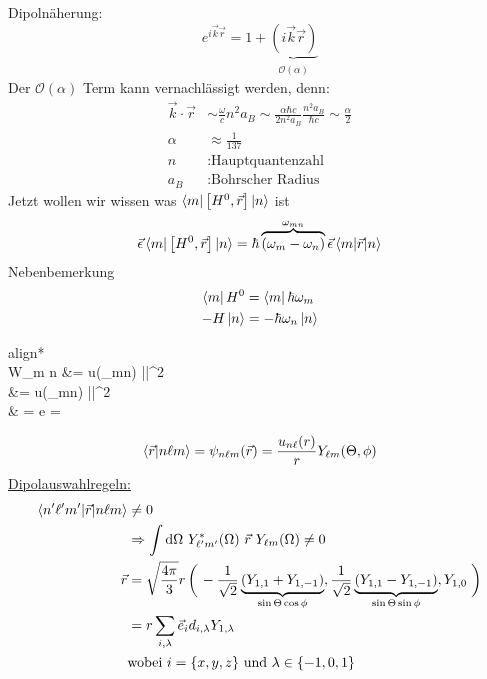 	Dipolnäherung: 
		\begin{equation*}
			e^{i \vec{k} \vec{r}} = 1 + 
			\underbrace{(i \vec{k} \vec{r})}_{\substack{\mathcal{O}(\alpha)}}
		\end{equation*}
	Der $\mathcal{O}(\alpha)$ Term kann vernachlässigt werden, denn:
		\begin{align*}
			\vec{k} \cdot \vec{r} 
			&\sim \frac{\omega}{c} n^2 a_B
			\sim \frac{\alpha \hbar c}{2 n^2 a_B} \frac{n^2 a_B}{\hbar c}
			\sim \frac{\alpha}{2} \\
			\alpha &\approx \frac{1}{137} \\
			n &: \text{Hauptquantenzahl} \\	
			a_B &: \text{Bohrscher Radius}		
		\end{align*}
	Jetzt wollen wir wissen was $\braket{m | \left[H^0 , \vec{r}\right] | n}$ ist
		\begin{align*}
			\vec{\epsilon} \braket{m | \left[H^0 , \vec{r}\right] | n} 
			= \hbar \overbrace{(\omega_m - \omega_n)}^{\mathclap{\omega_{mn}}} \vec{\epsilon} \braket{m | \vec{r} | n}
		\end{align*}
	Nebenbemerkung 
		\begin{align*}
			\bra{m} H^0 &= \bra{m} \hbar \omega_m \\
			-H \ket{n} &= -\hbar \omega_n \ket{n}
		\end{align*}
		\begin{empheq}[box=\boxed]{align*}
			 \\
					W_{m \rightarrow n} &=  u(\omega_{mn}) 
					\left|\right|^2\\
					&=  u(\omega_{mn}) 
					\left|\right|^2\\
					&  = e  =  \cdot {}
		\end{empheq}
		\begin{equation*}
			\braket{\vec{r} | n \ell m} = \psi_{n \ell m} (\vec{r}) 
			= \frac{u_{n \ell}(r)}{r} Y_{\ell m} (\Theta, \phi)
		\end{equation*}
	\underline{Dipolauswahlregeln:}
		\begin{align*}
			\braket{n' \ell' m' | \vec{r} | n \ell m} &\neq 0 \\
			&\Rightarrow \int \diff \Omega~Y^*_{\ell' m'}(\Omega)~\vec{r}~Y_{\ell m} (\Omega) \neq 0 \\
			\vec{r} &= \sqrt{\frac{4 \pi}{3}} r 
			\left( \vphantom{-\frac{1}{\sqrt{2}}} \right. -\frac{1}{\sqrt{2}} 
				\underbrace{(Y_{1,1} + Y_{1,-1})}_{\mathclap{\sin \Theta \cos \phi}},
				\frac{1}{\sqrt{2}} \underbrace{(Y_{1,1} - Y_{1,-1})}_{\mathclap{\sin \Theta \sin \phi}},
				Y_{1,0}
			\left. \vphantom{-\frac{1}{\sqrt{2}}} \right) \\
			&= r \sum_{i,\lambda} \vec{e}_i d_{i,\lambda} Y_{1,\lambda} \\
			&\text{wobei~} i = \{x,y,z\} \text{~und~} \lambda \in \{-1,0,1\} 
		\end{align*}

